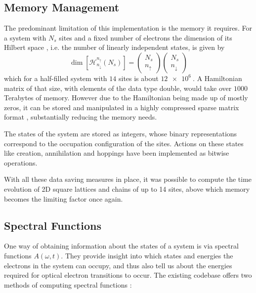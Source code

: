 \subsection{Memory Management}
The predominant limitation of this implementation is the memory it requires. For a system with $N_s$ sites and a fixed number of electrons the dimension of its Hilbert space , i.e. the number of linearly independent states, is given by 
\begin{equation}
    \dim \left[\mathcal{H}^{n_\uparrow}_{n_\downarrow} (N_s)\right] = \begin{pmatrix}N_s \\ n_\uparrow\end{pmatrix} \begin{pmatrix}N_s \\ n_\downarrow\end{pmatrix}
\end{equation}
which for a half-filled system with $14$ sites is about $\SI{12e6}{}$. A Hamiltonian matrix of that size, with elements of the data type double, would take over $1000$ Terabytes of memory. However due to the Hamiltonian being made up of mostly zeros, it can be stored and manipulated in a highly compressed sparse matrix format \cite{innerberger}, substantially reducing the memory needs.
\medskip

The states of the system are stored as integers, whose binary representations correspond to the occupation configuration of the sites. Actions on these states like creation, annihilation and hoppings have been implemented as bitwise operations.
\medskip
 
With all these data saving measures in place, it was possible to compute the time evolution of 2D square lattices and chains of up to 14 sites, above which memory becomes the limiting factor once again.


\subsection{Spectral Functions}\label{sec:spectral_functions}

One way of obtaining information about the states of a system is via spectral functions $A(\omega, t)$. They provide insight into which states and energies the electrons in the system can occupy, and thus also tell us about the energies required for optical electron transitions to occur. The existing codebase offers two methods of computing spectral functions \cite{spectral_function}:

